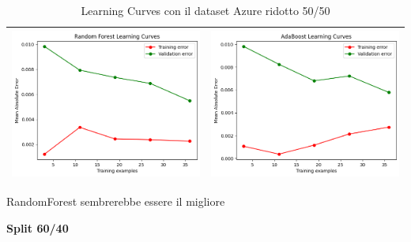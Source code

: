 \begin{table}[H]
\begin{tabularx}{\textwidth}{|X|X|}
        \includegraphics[width=\linewidth, trim=0 0 0 0]{images/RandomForest_lc50_ridottoAzure.png} &
        \includegraphics[width=\linewidth, trim=0 0 0 0]{images/AdaBoost_lc50_ridottoAzure.png} \\
        \hline
    \end{tabularx}
    \caption{Learning Curves con il dataset Azure ridotto 50/50}
    \label{tab:emissions_info}
\end{table}

\noindent RandomForest sembrerebbe essere il migliore

\noindent\textbf{Split 60/40}


